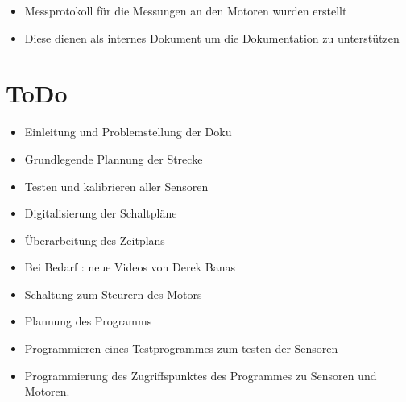\documentclass{article}
\begin{document}
\begin{itemize}

\item Messprotokoll f\"{u}r die Messungen an den Motoren wurden erstellt

\item Diese dienen als internes Dokument um die Dokumentation zu unterst\"{u}tzen

\end{itemize}

\section{ToDo}

\begin{itemize}

\item Einleitung  und Problemstellung der Doku

\item Grundlegende Plannung der Strecke

\item Testen und kalibrieren aller Sensoren

\item Digitalisierung der Schaltpl\"{a}ne

\item \"{U}berarbeitung des Zeitplans

\item Bei Bedarf : neue Videos von Derek Banas

\item Schaltung zum Steurern des Motors

\item Plannung des Programms

\item Programmieren eines Testprogrammes zum testen der Sensoren

\item Programmierung des Zugriffspunktes des Programmes zu Sensoren und Motoren.

\end{itemize}
\end{document}
